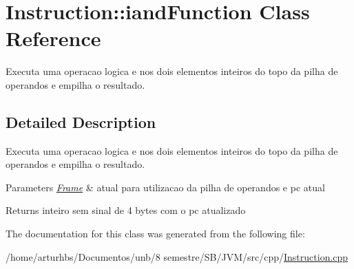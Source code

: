 \hypertarget{classInstruction_1_1iandFunction}{}\section{Instruction\+:\+:iand\+Function Class Reference}
\label{classInstruction_1_1iandFunction}


Executa uma operacao logica \textquotesingle{}e\textquotesingle{} nos dois elementos inteiros do topo da pilha de operandos e empilha o resultado.  




\subsection{Detailed Description}
Executa uma operacao logica \textquotesingle{}e\textquotesingle{} nos dois elementos inteiros do topo da pilha de operandos e empilha o resultado. 


\begin{DoxyParams}{Parameters}
{\em \hyperlink{classFrame}{Frame}} & atual para utilizacao da pilha de operandos e pc atual \\
\hline
\end{DoxyParams}
\begin{DoxyReturn}{Returns}
inteiro sem sinal de 4 bytes com o pc atualizado 
\end{DoxyReturn}


The documentation for this class was generated from the following file\+:\begin{DoxyCompactItemize}
\item 
/home/arturhbs/\+Documentos/unb/8 semestre/\+S\+B/\+J\+V\+M/src/cpp/\hyperlink{Instruction_8cpp}{Instruction.\+cpp}\end{DoxyCompactItemize}
